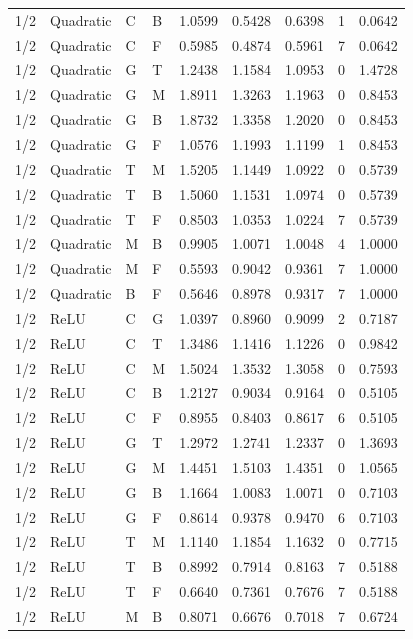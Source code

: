 \begin{longtable}{llllrrrrr}
1/2 & Quadratic & C & B & 1.0599 & 0.5428 & 0.6398 & 1 & 0.0642 \\
1/2 & Quadratic & C & F & 0.5985 & 0.4874 & 0.5961 & 7 & 0.0642 \\
1/2 & Quadratic & G & T & 1.2438 & 1.1584 & 1.0953 & 0 & 1.4728 \\
1/2 & Quadratic & G & M & 1.8911 & 1.3263 & 1.1963 & 0 & 0.8453 \\
1/2 & Quadratic & G & B & 1.8732 & 1.3358 & 1.2020 & 0 & 0.8453 \\
1/2 & Quadratic & G & F & 1.0576 & 1.1993 & 1.1199 & 1 & 0.8453 \\
1/2 & Quadratic & T & M & 1.5205 & 1.1449 & 1.0922 & 0 & 0.5739 \\
1/2 & Quadratic & T & B & 1.5060 & 1.1531 & 1.0974 & 0 & 0.5739 \\
1/2 & Quadratic & T & F & 0.8503 & 1.0353 & 1.0224 & 7 & 0.5739 \\
1/2 & Quadratic & M & B & 0.9905 & 1.0071 & 1.0048 & 4 & 1.0000 \\
1/2 & Quadratic & M & F & 0.5593 & 0.9042 & 0.9361 & 7 & 1.0000 \\
1/2 & Quadratic & B & F & 0.5646 & 0.8978 & 0.9317 & 7 & 1.0000 \\
1/2 & ReLU & C & G & 1.0397 & 0.8960 & 0.9099 & 2 & 0.7187 \\
1/2 & ReLU & C & T & 1.3486 & 1.1416 & 1.1226 & 0 & 0.9842 \\
1/2 & ReLU & C & M & 1.5024 & 1.3532 & 1.3058 & 0 & 0.7593 \\
1/2 & ReLU & C & B & 1.2127 & 0.9034 & 0.9164 & 0 & 0.5105 \\
1/2 & ReLU & C & F & 0.8955 & 0.8403 & 0.8617 & 6 & 0.5105 \\
1/2 & ReLU & G & T & 1.2972 & 1.2741 & 1.2337 & 0 & 1.3693 \\
1/2 & ReLU & G & M & 1.4451 & 1.5103 & 1.4351 & 0 & 1.0565 \\
1/2 & ReLU & G & B & 1.1664 & 1.0083 & 1.0071 & 0 & 0.7103 \\
1/2 & ReLU & G & F & 0.8614 & 0.9378 & 0.9470 & 6 & 0.7103 \\
1/2 & ReLU & T & M & 1.1140 & 1.1854 & 1.1632 & 0 & 0.7715 \\
1/2 & ReLU & T & B & 0.8992 & 0.7914 & 0.8163 & 7 & 0.5188 \\
1/2 & ReLU & T & F & 0.6640 & 0.7361 & 0.7676 & 7 & 0.5188 \\
1/2 & ReLU & M & B & 0.8071 & 0.6676 & 0.7018 & 7 & 0.6724 \\

\end{longtable}
